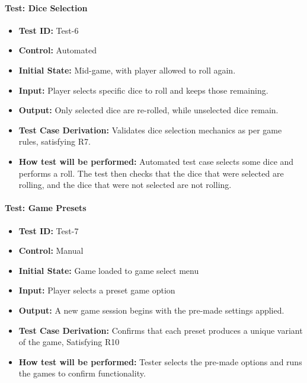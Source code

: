 \documentclass[12pt, titlepage]{article}
\begin{document}
\paragraph{\label{test-6}Test: Dice Selection}
\begin{itemize}
    \item \textbf{Test ID:} Test-6
    \item \textbf{Control:} Automated
    \item \textbf{Initial State:} Mid-game, with player allowed to roll again.
    \item \textbf{Input:} Player selects specific dice to roll and keeps those remaining.
    \item \textbf{Output:} Only selected dice are re-rolled, while unselected dice remain.
    \item \textbf{Test Case Derivation:} Validates dice selection mechanics as per game rules, satisfying R7.
    \item \textbf{How test will be performed:} Automated test case selects some dice and performs a roll. The test then checks that the dice that were selected are rolling, and the dice that were not selected are not rolling.
\end{itemize}

\paragraph{\label{test-7}Test: Game Presets}
\begin{itemize}
    \item \textbf{Test ID:} Test-7
    \item \textbf{Control:} Manual
    \item \textbf{Initial State:} Game loaded to game select menu
    \item \textbf{Input:} Player selects a preset game option
    \item \textbf{Output:} A new game session begins with the pre-made settings applied.
    \item \textbf{Test Case Derivation:} Confirms that each preset produces a unique variant of the game, Satisfying R10
    \item \textbf{How test will be performed:} Tester selects the pre-made options and runs the games to confirm functionality.
\end{itemize}
\end{document}
